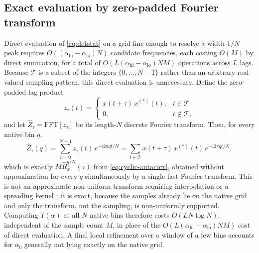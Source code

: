 \documentclass[10pt,twocolumn]{article}
\begin{document}
\subsection{Exact evaluation by zero-padded Fourier transform}
Direct evaluation of \eqref{eq:detstat} on a grid fine enough to resolve a
width-$1/N$ peak requires $O((\alpha_{\mathrm{hi}} -
\alpha_{\mathrm{lo}})N)$ candidate frequencies, each costing $O(M)$ by
direct summation, for a total of $O(L(\alpha_{\mathrm{hi}} -
\alpha_{\mathrm{lo}})NM)$ operations across $L$ lags. Because $\mathcal{T}$
is a subset of the integers $\{0,\dots,N-1\}$ rather than an arbitrary
real-valued sampling pattern, this direct evaluation is unnecessary. Define
the zero-padded lag product
\begin{equation}
z_\tau(t) = \begin{cases} x(t+\tau)\,x^{(*)}(t), & t \in \mathcal{T} \\
                          0, & t \notin \mathcal{T}, \end{cases}
\end{equation}
and let $\widehat{Z}_\tau = \mathrm{FFT}[z_\tau]$ be its length-$N$
discrete Fourier transform. Then, for every native bin $q$,
\begin{equation}
\widehat{Z}_\tau(q) = \sum_{t=0}^{N-1} z_\tau(t)\, e^{-i2\pi qt/N}
                     = \sum_{t \in \mathcal{T}} x(t+\tau)\,x^{(*)}(t)\,
                       e^{-i2\pi qt/N},
\label{eq:exact-fft}
\end{equation}
which is exactly $M\widehat{R}_x^{q/N}(\tau)$ from
\eqref{eq:cyclic-autocorr}, obtained without approximation for every $q$
simultaneously by a single fast Fourier transform. This is not an
approximate non-uniform transform requiring interpolation or a spreading
kernel \cite{dutt1993}; it is exact, because the samples already lie on the
native grid and only the transform, not the sampling, is non-uniformly
supported. Computing $T(\alpha)$ at all $N$ native bins therefore costs
$O(LN\log N)$, independent of the sample count $M$, in place of the
$O(L(\alpha_{\mathrm{hi}}-\alpha_{\mathrm{lo}})NM)$ cost of direct
evaluation. A final local refinement over a window of a few bins accounts
for $\alpha_0$ generally not lying exactly on the native grid.
\end{document}
